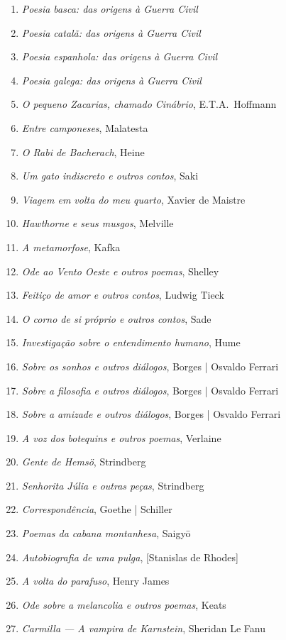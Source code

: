 \begin{enumerate}
\item \textit{Poesia basca: das origens à Guerra Civil} 
\item \textit{Poesia catalã: das origens à Guerra Civil} 
\item \textit{Poesia espanhola: das origens à Guerra Civil} 
\item \textit{Poesia galega: das origens à Guerra Civil} 
\item \textit{O pequeno Zacarias, chamado Cinábrio}, E.T.A.~Hoffmann
\item \textit{Entre camponeses}, Malatesta
\item \textit{O Rabi de Bacherach}, Heine
\item \textit{Um gato indiscreto e outros contos}, Saki
\item \textit{Viagem em volta do meu quarto}, Xavier de Maistre 
\item \textit{Hawthorne e seus musgos}, Melville
\item \textit{A metamorfose}, Kafka
\item \textit{Ode ao Vento Oeste e outros poemas}, Shelley
\item \textit{Feitiço de amor e outros contos}, Ludwig Tieck
\item \textit{O corno de si próprio e outros contos}, Sade
\item \textit{Investigação sobre o entendimento humano}, Hume
\item \textit{Sobre os sonhos e outros diálogos}, Borges | Osvaldo Ferrari
\item \textit{Sobre a filosofia e outros diálogos}, Borges | Osvaldo Ferrari
\item \textit{Sobre a amizade e outros diálogos}, Borges | Osvaldo Ferrari
\item \textit{A voz dos botequins e outros poemas}, Verlaine 
\item \textit{Gente de Hemsö}, Strindberg 
\item \textit{Senhorita Júlia e outras peças}, Strindberg 
\item \textit{Correspondência}, Goethe | Schiller
\item \textit{Poemas da cabana montanhesa}, Saigy\=o
\item \textit{Autobiografia de uma pulga}, [Stanislas de Rhodes]
\item \textit{A volta do parafuso}, Henry James
\item \textit{Ode sobre a melancolia e outros poemas}, Keats 
\item \textit{Carmilla --- A vampira de Karnstein}, Sheridan Le Fanu

\end{enumerate}
